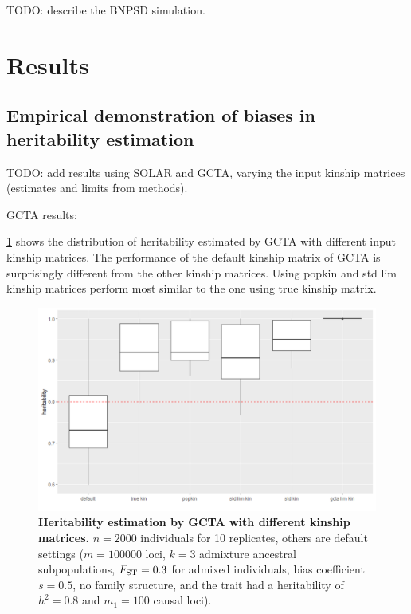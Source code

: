\documentclass[11pt]{article}
\begin{document}
TODO: describe the BNPSD simulation.

\section{Results}

\subsection{Empirical demonstration of biases in heritability estimation}

TODO: add results using SOLAR and GCTA, varying the input kinship matrices (estimates and limits from methods).

GCTA results:

\cref{fig:heritability_estimation} shows the distribution of heritability estimated by GCTA with different input kinship matrices.
The performance of the default kinship matrix of GCTA is surprisingly different from the other kinship matrices.
Using popkin and std lim kinship matrices perform most similar to the one using true kinship matrix.


\begin{figure}[bp!]
  \centering
  \includegraphics[width=6in]{herit_all_6_n_ind=2000-raw.pdf}
  \caption{
    {\bf Heritability estimation by GCTA with different kinship matrices.}
    $n = 2000$ individuals for 10 replicates, others are default settings ($m = 100000$ loci, $k = 3$ admixture ancestral subpopulations, $ F_{\text{ST}}   = 0.3$ for admixed individuals, bias coefficient $s = 0.5$, no family structure, and the trait had a heritability of $h^2 = 0.8$ and $m_1 = 100$ causal loci).
  }
  \label{fig:heritability_estimation}
\end{figure}
\end{document}
